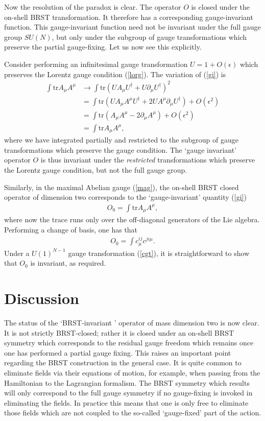 \documentclass[a4paper,a4paper]{article}
\begin{document}
Now the resolution of the paradox is clear. The operator $O$ is closed under the on-shell BRST transformation. It therefore has a corresponding gauge-invariant function. This gauge-invariant function need not be invariant under the full gauge group $SU(N)$, but only under the subgroup of gauge transformations which preserve the partial gauge-fixing. Let us now see this explicitly.

Consider performing an infinitesimal gauge transformation $U = 1 + O(\epsilon)$ which preserves the Lorentz gauge condition (\ref{lorg}). The variation of (\ref{gi}) is
\begin{align}
\int \mathrm{tr} A_{\mu} A^{\mu} 
&\rightarrow \int \mathrm{tr} (U A_{\mu} U^{\dag} + U \partial_{\mu} U^{\dag})^2 \nonumber \\
&= \int \mathrm{tr} (U  A_{\mu} A^{\mu}  U^{\dag} + 2 U A^{\mu} \partial_{\mu} U^{\dag} ) + O(\epsilon^2) \nonumber \\
&= \int \mathrm{tr} ( A_{\mu} A^{\mu} - 2 \partial_{\mu} A^{\mu} ) + O(\epsilon^2) \nonumber \\ 
&=  \int \mathrm{tr}  A_{\mu} A^{\mu},
\end{align}
where we have integrated partially and restricted to the subgroup of gauge transformations which preserve the gauge condition. The `gauge invariant' operator $O$ is thus invariant under the \emph{restricted} transformations which preserve the Lorentz gauge condition, but not the full gauge group.

Similarly, in the maximal Abelian gauge (\ref{mag}), the on-shell BRST closed operator of dimension two corresponds to the `gauge-invariant' quantity (\ref{gi})
\begin{gather}
O_0 = \int \mathrm{tr} A_{\mu} A^{\mu},
\end{gather}
where now the trace runs only over the off-diagonal generators of the Lie algebra. Performing a change of basis, one has that
\begin{gather}
O_0 = \int c_{\mu}^{ij}c^{ji\mu}.
\end{gather}
Under a $U(1)^{N-1}$ gauge transformation (\ref{cgt}), it is straightforward to show that $O_0$ is invariant, as required.

\section{Discussion}
The status of the `BRST-invariant ' operator of mass dimension two is now clear. It is not strictly BRST-closed; rather it is closed under an on-shell BRST symmetry which corresponds to the residual gauge freedom which remains once one has performed a partial gauge fixing. This raises an important point regarding the BRST construction in the general case. It is quite common to eliminate fields via their equations of motion, for example, when passing from the Hamiltonian to the Lagrangian formalism. The BRST symmetry which results will only correspond to the full gauge symmetry if no gauge-fixing is invoked in eliminating the fields. In practice this means that one is only free to eliminate those fields which are not coupled to the so-called `gauge-fixed' part of the action.
\end{document}
